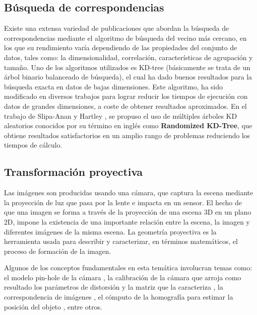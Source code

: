 \subsection{Búsqueda de correspondencias}
Existe una extensa variedad de publicaciones \cite{muja_flann_2009, AryaEtAl98, Beis:1997:SIU:794189.794431, Liu04aninvestigation} que abordan la búsqueda de correspondencias mediante el algoritmo de búsqueda del vecino más cercano, en los que su rendimiento varía dependiendo de las propiedades del conjunto de datos, tales como: la dimensionalidad, correlación, características de agrupación y tamaño. 
Uno de los algoritmos utilizados es KD-tree \cite{Beis:1997:SIU:794189.794431, Friedman:1977:AFB:355744.355745} (básicamente se trata de un árbol binario balanceado de búsqueda), el cual ha dado buenos resultados para la búsqueda exacta en datos de bajas dimensiones. Este algoritmo, ha sido modificado en diversos trabajos \cite{bb23918, AryaEtAl98, Beis:1997:SIU:794189.794431, VLDB95574, Fukunaga75, bb78856, bb79759, Liu04aninvestigation, bb77826} para lograr reducir los tiempos de ejecución con datos de grandes dimensiones, a coste de obtener resultados aproximados. En el trabajo de Slipa-Anan y Hartley \cite{Silpa_KDTree, bb77826}, se propuso el uso de múltiples árboles KD aleatorios conocidos por su término en inglés como \textbf{Randomized KD-Tree}, que obtiene resultados satisfactorios en un amplio rango de problemas \cite{muja_flann_2009} reduciendo los tiempos de cálculo.
\subsection{Transformación proyectiva}
Las imágenes son producidas usando una cámara, que captura la escena mediante la proyección de luz que pasa por la lente e impacta en un sensor. El hecho de que una imagen se forma a través de la proyección de una escena 3D en un plano 2D, impone la existencia de una importante relación entre la escena, la imagen y diferentes imágenes de la misma escena. La geometría proyectiva es la herramienta usada para describir y caracterizar, en términos matemáticos, el proceso de formación de la imagen.

Algunos de los conceptos fundamentales en esta temática involucran temas como: el modelo pin-hole de la cámara \cite{citeulike:3484001, citeulike:9456628}, la calibración de la cámara que arroja como resultado los parámetros de distorsión y la matriz que la caracteriza \cite{citeulike:3484001, citeulike:9456628, Azuma:2001:RAA:616073.618862}, la correspondencia de imágenes \cite{citeulike:3484001, citeulike:9456628}, el cómputo de la homografía para estimar la posición del objeto \cite{citeulike:3484001, citeulike:9456628, conf/icra/2010}, entre otros.
